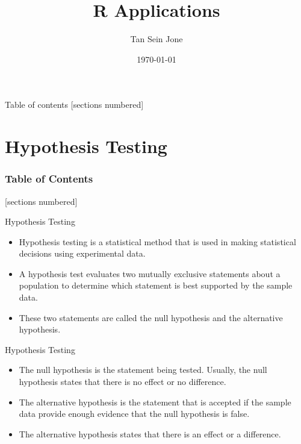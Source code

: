 \documentclass[serif, 9pt, aspectratio=32]{beamer}
\title{R Applications}
\date{\today}
\author{Tan Sein Jone}
\institute{University of British Columbia}
\begin{document}
\maketitle

\begin{frame}{Table of contents}
    [sections numbered]
    \tableofcontents[hideallsubsections]
\end{frame}

\section{Hypothesis Testing}

\begin{frame}
    \frametitle{Table of Contents}
    [sections numbered]
    \tableofcontents[currentsection]
\end{frame}

\begin{frame}{Hypothesis Testing}
    \begin{itemize}
        \item Hypothesis testing is a statistical method that is used in making statistical decisions using experimental data.
        \item A hypothesis test evaluates two mutually exclusive statements about a population to determine which statement is best supported by the sample data.
        \item These two statements are called the null hypothesis and the alternative hypothesis.
    \end{itemize}
\end{frame}

\begin{frame}{Hypothesis Testing}
    \begin{itemize}
        \setlength{\itemsep}{2em}
        \item The null hypothesis is the statement being tested. Usually, the null hypothesis states that there is no effect or no difference.
        \item The alternative hypothesis is the statement that is accepted if the sample data provide enough evidence that the null hypothesis is false.
        \item The alternative hypothesis states that there is an effect or a difference.
    \end{itemize}
\end{frame}
\end{document}
